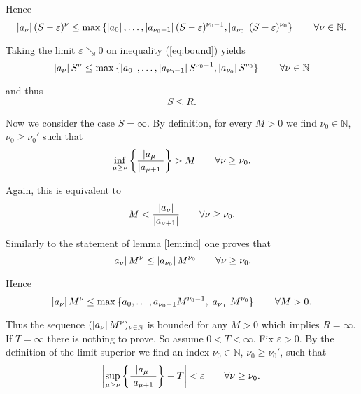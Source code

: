 \begin{enumerate}[label = \textbf{Exercise \arabic*.},wide = 0pt, itemsep=1.5ex]
		Hence 
		\begin{equation}
			\abs[0]{a_\nu}(S - \varepsilon)^\nu \leq \max\cbr[0]{\abs[0]{a_0},\dots,\abs[0]{a_{\nu_0 - 1}}(S - \varepsilon)^{\nu_0 -1},\abs[0]{a_{\nu_0}}(S - \varepsilon)^{\nu_0}} \qquad \forall \nu \in \mathbb{N}.
			\label{eq:bound}
		\end{equation}

		Taking the limit $\varepsilon \searrow 0$ on inequality (\ref{eq:bound}) yields
		\begin{equation}
			\abs[0]{a_\nu}S^\nu \leq \max\cbr[0]{\abs[0]{a_0},\dots,\abs[0]{a_{\nu_0 - 1}}S^{\nu_0 -1},\abs[0]{a_{\nu_0}}S^{\nu_0}} \qquad \forall \nu \in \mathbb{N}
		\end{equation}

		\noindent and thus
		\begin{equation}
			S \leq R.
		\end{equation}

		Now we consider the case $S = \infty$. By definition, for every $M > 0$ we find $\nu_0 \in \mathbb{N}$, $\nu_0 \geq \nu_0'$ such that 
		\begin{equation}
			\inf_{\mu \geq \nu}\cbr[3]{\frac{\abs[0]{a_\mu}}{\abs[0]{a_{\mu + 1}}}} > M \qquad \forall \nu \geq \nu_0.
		\end{equation}

		Again, this is equivalent to
		\begin{equation}
			 M < \frac{\abs[0]{a_\nu}}{\abs[0]{a_{\nu + 1}}} \qquad \forall \nu \geq \nu_0.
		\end{equation}

		Similarly to the statement of lemma \ref{lem:ind} one proves that 
		\begin{equation}
			\abs[0]{a_\nu}M^\nu \leq \abs[0]{a_{\nu_0}}M^{\nu_0} \qquad \forall \nu \geq \nu_0.
		\end{equation}

		Hence
		\begin{equation}
			\abs[0]{a_\nu}M^\nu \leq \max\cbr[0]{a_0,\dots,a_{\nu_0 - 1}M^{\nu_0 - 1},\abs[0]{a_{\nu_0}}M^{\nu_0}} \qquad \forall M > 0.
		\end{equation}

		Thus the sequence $(\abs[0]{a_\nu}M^\nu)_{\nu \in \mathbb{N}}$ is bounded for any $M > 0$ which implies $R = \infty$.\\
		If $T = \infty$ there is nothing to prove. So assume $0 < T < \infty$. Fix $ \varepsilon > 0$. By the definition of the limit superior we find an index $\nu_0 \in \mathbb{N}$, $\nu_0 \geq \nu_0'$, such that
		\begin{equation}
			\abs[3]{\sup_{\mu \geq \nu}\cbr[3]{\frac{\abs[0]{a_\mu}}{\abs[0]{a_{\mu + 1}}}} - T} < \varepsilon \qquad \forall \nu \geq \nu_0.
			\label{eq:est_sup}
		\end{equation}


\end{enumerate}
